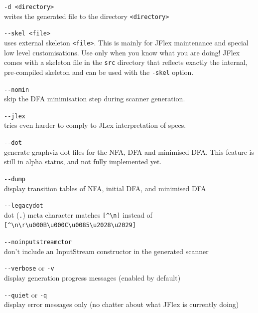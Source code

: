 \documentclass[11pt]{scrartcl}
\begin{document}
\begin{description}
\item \verb+-d <directory>+\\
  writes the generated file to the directory \verb+<directory>+

\item \verb+--skel <file>+\\
  uses external skeleton \verb+<file>+. This is mainly for JFlex
  maintenance and special low level customisations. Use only when you
  know what you are doing! JFlex comes with a skeleton file in the
  \texttt{src} directory that reflects exactly the internal, pre-compiled
  skeleton and can be used with the \texttt{-skel} option.

\item \verb+--nomin+\\
  skip the DFA minimisation step during scanner generation.

\item \verb+--jlex+\\
  tries even harder to comply to JLex interpretation of specs.

\item \verb+--dot+\\
  generate graphviz dot files for the NFA, DFA and minimised 
  DFA. This feature is still in alpha status, and not
  fully implemented yet. 

\item \verb+--dump+\\
  display transition tables of NFA, initial DFA, and minimised DFA 

\item \verb+--legacydot+\\
  dot (\texttt{.}) meta character matches \verb+[^\n]+ instead of\\
  \verb+[^\n\r\u000B\u000C\u0085\u2028\u2029]+
  
\item \verb+--noinputstreamctor+\\
  don't include an InputStream constructor in the generated scanner

\item \verb+--verbose+ or \texttt{-v}\\
  display generation progress messages (enabled by default)

\item \verb+--quiet+ or \texttt{-q}\\
  display error messages only (no chatter about what JFlex is
  currently doing)


\end{description}
\end{document}
